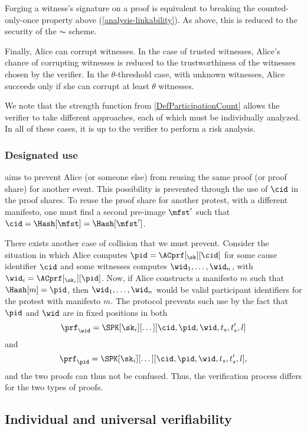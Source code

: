 Forging a witness's signature on a proof is equivalent to breaking the 
counted-only-once property 
above (\cref{analysis-linkability}).
As above, this is reduced to the security of the \(\AC\) scheme.

Finally, Alice can corrupt witnesses.
In the case of trusted witnesses, Alice's chance of corrupting witnesses is 
reduced to the trustworthiness of the witnesses chosen by the verifier.
In the \(\theta\)-threshold case, with unknown witnesses, 
Alice succeeds only if she can corrupt at least \(\theta\) witnesses.

We note that the strength function from \cref{DefParticipationCount} allows the 
verifier to take different approaches, each of which must be individually 
analyzed.
In all of these cases, it is up to the verifier to perform a risk analysis.

\subsubsection{Designated use}%
\label{analysis-designated}

 aims to prevent Alice (or someone else) from reusing the 
same proof (or proof share) for another event.
This possibility is prevented through the use of \(\cid\) in the proof shares.
To reuse the proof share for another protest, with a different manifesto, one 
must find a second pre-image \(\mfst'\) such that \(\cid = \Hash[\mfst] = 
  \Hash[\mfst']\).

There exists another case of collision that we must prevent.
Consider the situation in which Alice computes \(\pid = \ACprf[_\sk][\cid]\) for some cause identifier \(\cid\) and some witnesses computes \(\wid_1, \dotsc, \wid_n\), with \(\wid_i = \ACprf[_{\sk_i}][\pid]\).
Now, if Alice constructs a manifesto \(m\) such that \(\Hash[m] = \pid\), then \(\wid_1, \dotsc, \wid_n\) would be valid participant identifiers for the protest with manifesto \(m\).
The protocol prevents such use by the fact that \(\pid\) and \(\wid\) are in 
fixed positions in both \[
  \prf_{\wid} = \SPK[\sk_i][\dotsc][\cid, \pid, \wid, t_s, t_s', l]
\] and \[
  \prf_{\pid} = \SPK[\sk_i][\dotsc][\cid, \pid, \wid, t_s, t_s', l],
\] and the two proofs can thus not be confused.
Thus, the verification process differs for the two types of proofs.

\subsection{Individual and universal verifiability}%
\label{analysis-individual}%
\label{analysis-universal}

